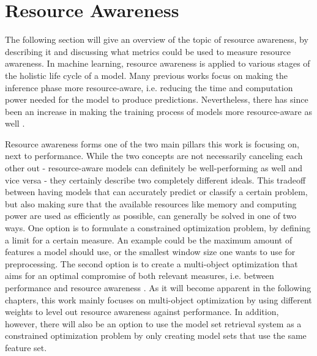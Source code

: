 \section{Resource Awareness}

The following section will give an overview of the topic of resource awareness, by describing it and discussing what metrics could be used to measure resource awareness. In machine learning, resource awareness is applied to various stages of the holistic life cycle of a model. Many previous works focus on making the inference phase more resource-aware, i.e. reducing the time and computation power needed for the model to produce predictions. Nevertheless, there has since been an increase in making the training process of models more resource-aware as well \cite{rapp2022}.

Resource awareness forms one of the two main pillars this work is focusing on, next to performance. While the two concepts are not necessarily canceling each other out - resource-aware models can definitely be well-performing as well and vice versa - they certainly describe two completely different ideals. This tradeoff between having models that can accurately predict or classify a certain problem, but also making sure that the available resources like memory and computing power are used as efficiently as possible, can generally be solved in one of two ways. One option is to formulate a constrained optimization problem, by defining a limit for a certain measure. An example could be the maximum amount of features a model should use, or the smallest window size one wants to use for preprocessing. The second option is to create a multi-object optimization that aims for an optimal compromise of both relevant measures, i.e. between performance and resource awareness \cite{feurer2019}. As it will become apparent in the following chapters, this work mainly focuses on multi-object optimization by using different weights to level out resource awareness against performance. In addition, however, there will also be an option to use the model set retrieval system as a constrained optimization problem by only creating model sets that use the same feature set.

